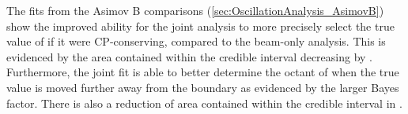 The fits from the Asimov B comparisons (\autoref{sec:OscillationAnalysis_AsimovB}) show the improved ability for the joint analysis to more precisely select the true value of  if it were CP-conserving, compared to the beam-only analysis. This is evidenced by the area contained within the \quickmath{1\sigma} credible interval decreasing by . Furthermore, the joint fit is able to better determine the octant of  when the true value is moved further away from the boundary as evidenced by the larger Bayes factor. There is also a  reduction of area contained within the \quickmath{1\sigma} credible interval in .
